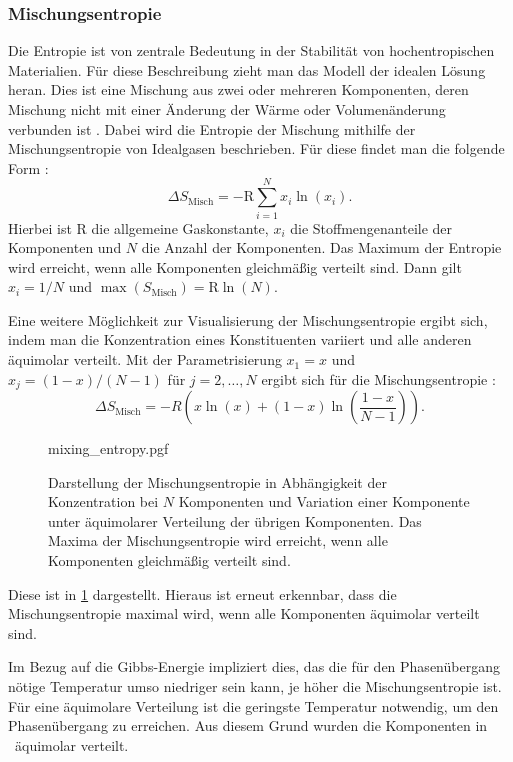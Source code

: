 \subsubsection{Mischungsentropie}
Die Entropie ist von zentrale Bedeutung in der Stabilität von hochentropischen Materialien.
Für diese Beschreibung zieht man das Modell der idealen Lösung heran.
Dies ist eine Mischung aus zwei oder mehreren Komponenten, deren Mischung nicht mit einer Änderung der
Wärme oder Volumenänderung verbunden ist \autocite{DeHoff2006}.
Dabei wird die Entropie der Mischung mithilfe der Mischungsentropie von Idealgasen beschrieben.
Für diese findet man die folgende Form \autocite{rost_phd}:
\begin{equation}
    \Delta S_{\text{Misch}} = -\mathrm{R} \sum_{i=1}^N x_{i} \ln(x_{i}).
    \label{eq:Mischungsentropie}
\end{equation}
Hierbei ist $\mathrm{R}$ die allgemeine Gaskonstante, $x_{i}$ die Stoffmengenanteile der Komponenten und $N$ die Anzahl
der Komponenten.
Das Maximum der Entropie wird erreicht, wenn alle Komponenten gleichmäßig verteilt sind.
Dann gilt $x_{i}=1/N$ und $\max(S_{\text{Misch}}) = \mathrm{R} \ln(N)$.

Eine weitere Möglichkeit zur Visualisierung der Mischungsentropie ergibt sich, indem man die Konzentration eines
Konstituenten variiert und alle anderen äquimolar verteilt.
Mit der Parametrisierung $x_{1} = x$ und $x_{j} = (1-x) / (N-1)$ für $j=2, \dots, N$ ergibt sich für die
Mischungsentropie \autocite{Rost2015}:
\begin{equation}
    \Delta S_{\text{Misch}} = -R \left( x \ln(x) + (1-x) \ln \left( \frac{1-x}{N-1} \right) \right).
    \label{eq:Mischungsentropie2}
\end{equation}
\begin{figure}
    \centering
    {mixing_entropy.pgf}
    \caption{Darstellung der Mischungsentropie in Abhängigkeit der Konzentration bei $N$ Komponenten und Variation einer
    Komponente unter äquimolarer Verteilung der übrigen Komponenten.
    Das Maxima der Mischungsentropie wird erreicht, wenn alle Komponenten gleichmäßig verteilt sind.
    }
    \label{fig:Mischungsentropie}
\end{figure}

Diese ist in \cref{fig:Mischungsentropie} dargestellt.
Hieraus ist erneut erkennbar, dass die Mischungsentropie maximal wird, wenn alle Komponenten äquimolar verteilt sind.

Im Bezug auf die Gibbs-Energie impliziert dies, das die für den Phasenübergang nötige Temperatur umso niedriger sein
kann, je höher die Mischungsentropie ist.
Für eine äquimolare Verteilung ist die geringste Temperatur notwendig, um den Phasenübergang zu erreichen.
Aus diesem Grund wurden die Komponenten in \heo\ äquimolar verteilt.

